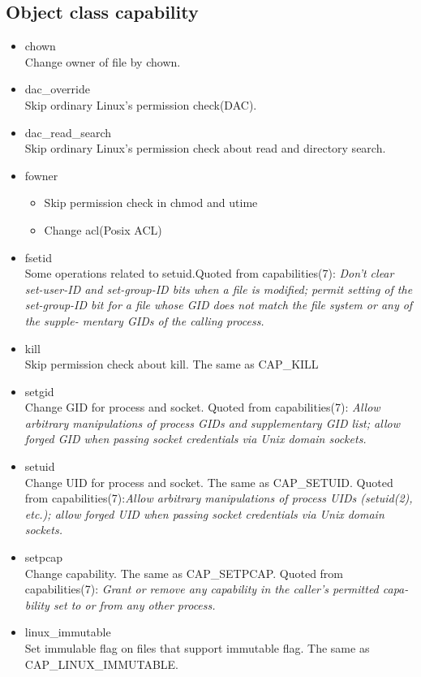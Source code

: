 \documentclass{article}
\begin{document}
\subsection{Object class capability}
 \begin{itemize}
 \item    chown\\
	  Change owner of file by chown. 
 \item dac\_override\\
	  Skip ordinary Linux's permission check(DAC). 

 \item  dac\_read\_search\\
	  Skip ordinary Linux's permission check about read and
	  directory search. 
 \item   fowner
	  \begin{itemize}
	   \item  Skip permission check in chmod and utime\\
	   \item Change acl(Posix ACL)\\
	  \end{itemize}
  \item       fsetid\\
	  Some operations related to setuid.Quoted from capabilities(7):	  
	  {\it Don't  clear  set-user-ID  and  set-group-ID bits when a file is
              modified; permit setting of the  set-group-ID  bit  for  a  file
              whose  GID  does not match the file system or any of the supple-
              mentary GIDs of the calling process.}

	  
  \item  kill\\
	  Skip permission check about kill. The same as CAP\_KILL
	  
  \item setgid\\
	  Change GID for process and socket. Quoted from
	  capabilities(7):{\it 
     Allow  arbitrary manipulations of process GIDs and supplementary
              GID list; allow forged GID when passing socket  credentials  via
              Unix domain sockets.}

  \item setuid\\
	  Change UID for process and socket. The same as CAP\_SETUID.
	  Quoted from capabilities(7):{\it Allow arbitrary manipulations of process UIDs (setuid(2), etc.);
	  allow forged UID when passing socket credentials via Unix domain
	  sockets.}
  \item  setpcap\\ 
	  Change capability. The same as CAP\_SETPCAP. Quoted from capabilities(7):{\it
	  Grant  or  remove any capability in the caller's permitted capa-
	  bility set to or from any other process.}
  \item linux\_immutable \\ 
	  Set immulable flag on files that support immutable flag.  The
	  same as CAP\_LINUX\_IMMUTABLE.
	  

\end{itemize}
\end{document}
